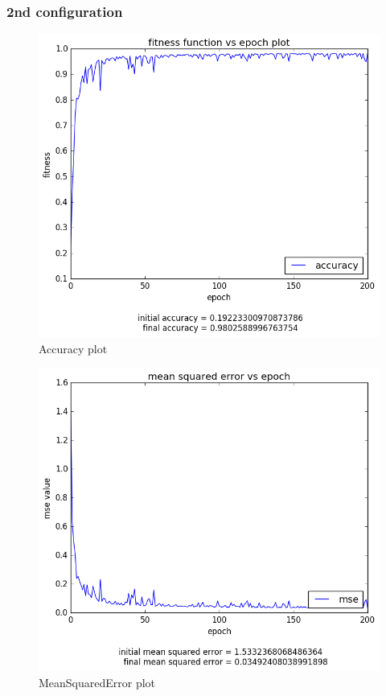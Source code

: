 \documentclass[12pt,a4paper]{article}
\begin{document}
\subsubsection{2nd configuration}
\begin{figure}[H]
\centering
\includegraphics[scale=0.4]{img/all_acc_2.png}
\caption{Accuracy plot}
\end{figure}
\begin{figure}[H]
\centering
\includegraphics[scale=0.4]{img/all_mse_2.png}
\caption{MeanSquaredError plot}
\end{figure}
\end{document}
